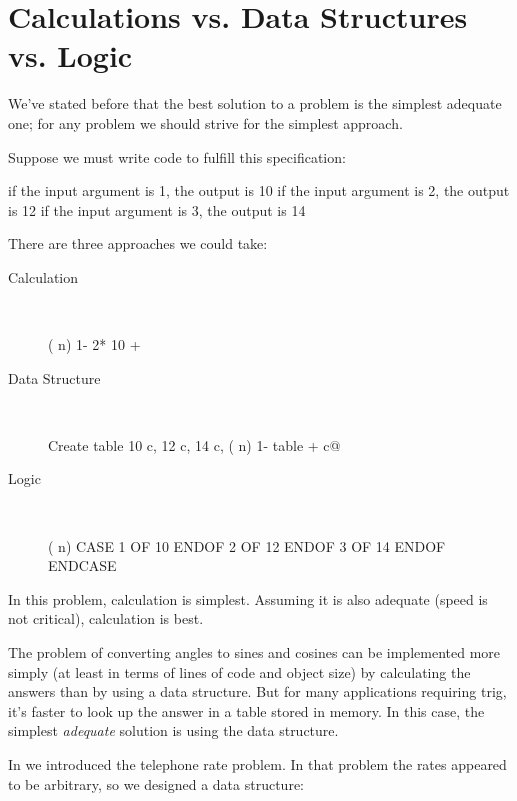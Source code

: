 \section{Calculations vs. Data Structures vs. Logic}%
%
%
%
%
%

We've stated before that the best solution to a problem is the simplest
adequate one; for any problem we should strive for the simplest
approach.

Suppose we must write code to fulfill this specification:

\begin{Code}[fontfamily=cmss]
if the input argument is 1, the output is 10
if the input argument is 2, the output is 12
if the input argument is 3, the output is 14
\end{Code}
There are three approaches we could take:

\begin{description}
\item[Calculation]~
\begin{Code}
( n)  1-  2*  10 +
\end{Code}
\medbreak
\item[Data Structure]~
\begin{Code}
Create table  10 c,  12 c,  14 c,
( n)  1- table + c@
\end{Code}
\medbreak
\item[Logic]~
\begin{Code}
( n)  CASE
         1 OF 10 ENDOF
         2 OF 12 ENDOF
         3 OF 14 ENDOF  ENDCASE
\end{Code}
\end{description}
In this problem, calculation is simplest. Assuming it is also adequate
(speed is not critical), calculation is best.

The problem of converting angles to sines and cosines can be implemented
more simply (at least in terms of lines of code and object size)
by calculating the answers than by using a data structure. But for many
applications requiring trig, it's faster to look up the answer in a table
stored in memory. In this case, the simplest \emph{adequate} solution is
using the data structure.

In  we introduced the telephone rate problem. In that
problem the rates appeared to be arbitrary, so we designed a data
structure:

